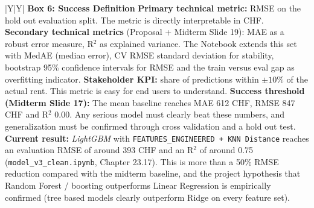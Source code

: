 \documentclass[11pt, a4paper]{article}
\begin{document}
{\begin{xltabular}{\textwidth}{|Y|Y|}
    \textbf{\color{accent}Box 6: Success Definition} \newline
    \textbf{Primary technical metric:} RMSE on the hold out evaluation split. The metric is directly interpretable in CHF.
    \newline\newline
    \textbf{Secondary technical metrics} (Proposal + Midterm Slide 19): MAE as a robust error measure, R$^2$ as explained variance. The Notebook extends this set with MedAE (median error), CV RMSE standard deviation for stability, bootstrap 95\% confidence intervals for RMSE and the train versus eval gap as overfitting indicator.
    \newline\newline
    \textbf{Stakeholder KPI:} share of predictions within $\pm 10\%$ of the actual rent. This metric is easy for end users to understand.
    \newline\newline
    \textbf{Success threshold (Midterm Slide 17):} The mean baseline reaches MAE 612 CHF, RMSE 847 CHF and R$^2$ 0.00. Any serious model must clearly beat these numbers, and generalization must be confirmed through cross validation and a hold out test.
    \newline\newline
    \textbf{Current result:} \emph{LightGBM} with \texttt{FEATURES\_ENGINEERED + KNN Distance} reaches an evaluation RMSE of around 393 CHF and an R$^2$ of around 0.75 (\texttt{model\_v3\_clean.ipynb}, Chapter 23.17). This is more than a 50\% RMSE reduction compared with the midterm baseline, and the project hypothesis that Random Forest / boosting outperforms Linear Regression is empirically confirmed (tree based models clearly outperform Ridge on every feature set).
    \\ \hline


\end{xltabular}}
\end{document}
